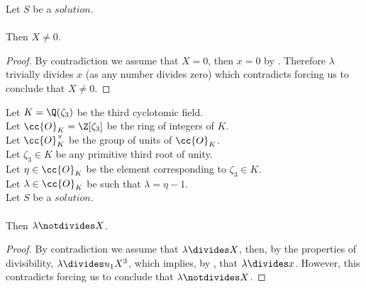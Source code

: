 \begin{lemma}
  \label{lmm:X_ne_zero}
  \leanok
  Let $S$ be a $solution$.\\\\
  Then $X \neq 0$.
\end{lemma}
\begin{proof}
  \leanok
  By contradiction we assume that $X = 0$, then $x = 0$ by .
  Therefore $\lambda$ trivially divides $x$ (as any number divides zero) which contradicts
   forcing us to conclude that $X \neq 0$.
\end{proof}

\begin{lemma}
  \label{lmm:lambda_not_dvd_X}
  \leanok
  Let $K = \Q(\zeta_3)$ be the third cyclotomic field. \\
  Let $\cc{O}_K = \Z[\zeta_3]$ be the ring of integers of $K$. \\
  Let $\cc{O}^\times_K$ be the group of units of $\cc{O}_K$. \\
  Let $\zeta_3 \in K$ be any primitive third root of unity. \\
  Let $\eta \in \cc{O}_K$ be the element corresponding to $\zeta_3 \in K$. \\
  Let $\lambda \in \cc{O}_K$ be such that $\lambda = \eta -1$. \\
  Let $S$ be a $solution$.\\\\
  Then $\lambda \notdivides X$.
\end{lemma}
\begin{proof}
  \leanok
  By contradiction we assume that $\lambda \divides X$, then, by the properties of divisibility,
  $\lambda \divides u_1 X^3$, which implies, by ,
  that $\lambda \divides x$.
  However, this contradicts 
  forcing us to conclude that $\lambda \notdivides X$.
\end{proof}

